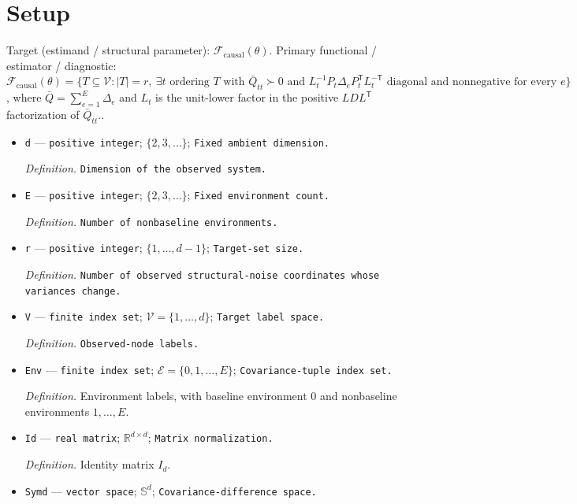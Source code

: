 \documentclass{article}
\begin{document}
\section{Setup}

Target (estimand / structural parameter): \(\mathcal F_{\mathrm{causal}}(\theta)\).
Primary functional / estimator / diagnostic: \(\mathcal F_{\mathrm{causal}}(\theta)=\{T\subseteq\mathcal V:|T|=r,\ \exists t\text{ ordering }T\text{ with }\bar Q_{tt}\succ0\text{ and }L_t^{-1}P_t\Delta_eP_t^{\mathsf T}L_t^{-\mathsf T}\text{ diagonal and nonnegative for every }e\}\), where \(\bar Q=\sum_{e=1}^E\Delta_e\) and \(L_t\) is the unit-lower factor in the positive \(LDL^{\mathsf T}\) factorization of \(\bar Q_{tt}\)..
\begin{itemize}
  \item \texttt{d} --- \texttt{positive integer}; \(\{2,3,\ldots\}\); \texttt{Fixed ambient dimension.}
  \par\smallskip\noindent\emph{Definition.} \texttt{Dimension of the observed system.}
  \item \texttt{E} --- \texttt{positive integer}; \(\{2,3,\ldots\}\); \texttt{Fixed environment count.}
  \par\smallskip\noindent\emph{Definition.} \texttt{Number of nonbaseline environments.}
  \item \texttt{r} --- \texttt{positive integer}; \(\{1,\ldots,d-1\}\); \texttt{Target-\allowbreak{}set size.}
  \par\smallskip\noindent\emph{Definition.} \texttt{Number of observed structural-\allowbreak{}noise coordinates whose variances change.}
  \item \texttt{V} --- \texttt{finite index set}; \(\mathcal V=\{1,\ldots,d\}\); \texttt{Target label space.}
  \par\smallskip\noindent\emph{Definition.} \texttt{Observed-\allowbreak{}node labels.}
  \item \texttt{Env} --- \texttt{finite index set}; \(\mathcal E=\{0,1,\ldots,E\}\); \texttt{Covariance-\allowbreak{}tuple index set.}
  \par\smallskip\noindent\emph{Definition.} Environment labels, with baseline environment \(0\) and nonbaseline environments \(1,\ldots,E\).
  \item \texttt{Id} --- \texttt{real matrix}; \(\mathbb R^{d\times d}\); \texttt{Matrix normalization.}
  \par\smallskip\noindent\emph{Definition.} Identity matrix \(I_d\).
  \item \texttt{Symd} --- \texttt{vector space}; \(\mathbb S^d\); \texttt{Covariance-\allowbreak{}difference space.}

\end{itemize}
\end{document}
